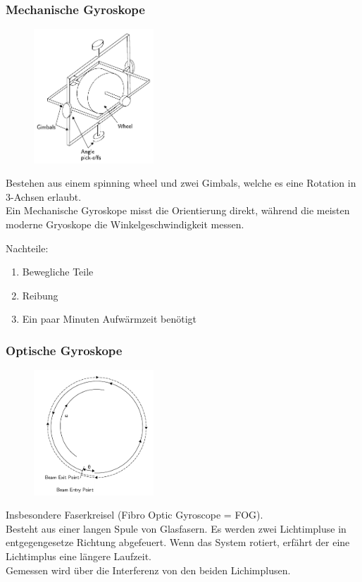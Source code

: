 \documentclass[10pt,a4paper,oneside]{beamer}
\begin{document}
\begin{frame}
	\frametitle{Mechanische Gyroskope}
	\begin{figure}
	\includegraphics[width=0.4\textwidth]{images/mechanical_gyroscope.png} 
	\end{figure}
	
	Bestehen aus einem spinning wheel und zwei Gimbals, welche es eine Rotation in 3-Achsen erlaubt. \\
	Ein Mechanische Gyroskope misst die Orientierung direkt, 
	während die meisten moderne Gryoskope die Winkelgeschwindigkeit messen.
	
	Nachteile:
	\begin{enumerate}
	  	\item Bewegliche Teile
	  	\item Reibung
	  	\item Ein paar Minuten Aufwärmzeit benötigt
	  \end{enumerate}

\end{frame}

\begin{frame}
	\frametitle{Optische Gyroskope}
	\begin{figure}
	\includegraphics[width=0.4\textwidth]{images/fog.png} 
	\end{figure}
	
	Insbesondere Faserkreisel (Fibro Optic Gyroscope = FOG). \\
	Besteht aus einer langen Spule von Glasfasern. Es werden zwei Lichtimpluse in entgegengesetze Richtung abgefeuert. Wenn das System rotiert, erfährt der eine Lichtimplus eine längere Laufzeit.\\
	Gemessen wird über die Interferenz von den beiden Lichimplusen.

\end{frame}
\end{document}
